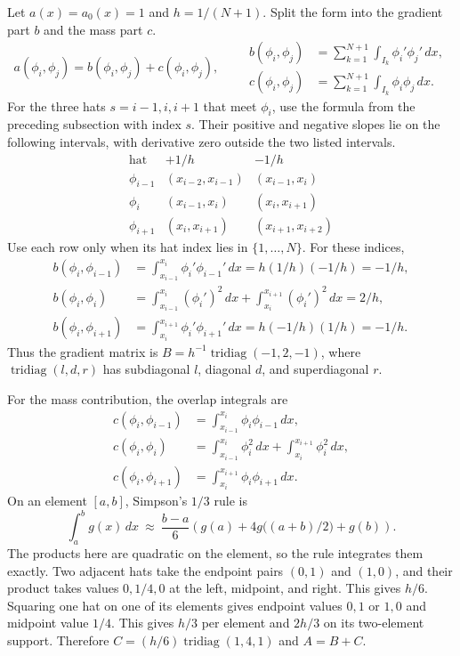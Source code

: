 \documentclass[11pt,a4paper]{article}
\begin{document}
Let \(a(x)=a_0(x)=1\) and \(h=1/(N+1)\). Split the form into the
gradient part \(b\) and the mass part \(c\).
\[
 a(\phi_i,\phi_j)=b(\phi_i,\phi_j)+c(\phi_i,\phi_j),\qquad
 \begin{aligned}
 b(\phi_i,\phi_j)&=\sum_{k=1}^{N+1}\int_{I_k}\phi_i'\phi_j'\,dx,\\
 c(\phi_i,\phi_j)&=\sum_{k=1}^{N+1}\int_{I_k}\phi_i\phi_j\,dx.
 \end{aligned}
\]
For the three hats \(s=i-1,i,i+1\) that meet \(\phi_i\), use the
formula from the preceding subsection with index \(s\). Their positive
and negative slopes lie on the following intervals, with derivative
zero outside the two listed intervals.
\[
 \begin{array}{c|cc}
 \text{hat} & +1/h & -1/h\\ \hline
 \phi_{i-1} &(x_{i-2},x_{i-1})&(x_{i-1},x_i)\\
 \phi_i &(x_{i-1},x_i)&(x_i,x_{i+1})\\
 \phi_{i+1} &(x_i,x_{i+1})&(x_{i+1},x_{i+2})
 \end{array}
\]
Use each row only when its hat index lies in \(\{1,\ldots,N\}\).
For these indices,
\[
\begin{aligned}
 b(\phi_i,\phi_{i-1})
 &=\int_{x_{i-1}}^{x_i}\phi_i'\phi_{i-1}'\,dx
   =h(1/h)(-1/h)=-1/h,\\
 b(\phi_i,\phi_i)
 &=\int_{x_{i-1}}^{x_i}(\phi_i')^2\,dx+
   \int_{x_i}^{x_{i+1}}(\phi_i')^2\,dx
   =2/h,\\
 b(\phi_i,\phi_{i+1})
 &=\int_{x_i}^{x_{i+1}}\phi_i'\phi_{i+1}'\,dx
   =h(-1/h)(1/h)=-1/h.
\end{aligned}
\]
Thus the gradient matrix is
\(B=h^{-1}\operatorname{tridiag}(-1,2,-1)\), where
\(\operatorname{tridiag}(l,d,r)\) has subdiagonal \(l\), diagonal \(d\),
and superdiagonal \(r\).

For the mass contribution, the overlap integrals are
\[
\begin{aligned}
 c(\phi_i,\phi_{i-1})&=\int_{x_{i-1}}^{x_i}\phi_i\phi_{i-1}\,dx,\\
 c(\phi_i,\phi_i)&=\int_{x_{i-1}}^{x_i}\phi_i^2\,dx+
                     \int_{x_i}^{x_{i+1}}\phi_i^2\,dx,\\
 c(\phi_i,\phi_{i+1})&=\int_{x_i}^{x_{i+1}}\phi_i\phi_{i+1}\,dx .
\end{aligned}
\]
On an element \([a,b]\), Simpson's \(1/3\) rule is
\[
 \int_a^b g(x)\,dx\ \approx\
 \frac{b-a}{6}\left(g(a)+4g\bigl((a+b)/2\bigr)+g(b)\right).
\]
The products here are quadratic on the element, so the rule integrates
them exactly. Two adjacent hats take the endpoint pairs \((0,1)\)
and \((1,0)\), and their product takes values \(0,1/4,0\) at the left,
midpoint, and right. This gives \(h/6\). Squaring one hat on one
of its elements gives endpoint values \(0,1\) or \(1,0\) and midpoint
value \(1/4\). This gives \(h/3\) per element and \(2h/3\) on its
two-element support. Therefore \(C=(h/6)\operatorname{tridiag}(1,4,1)\)
and \(A=B+C\).
\end{document}
